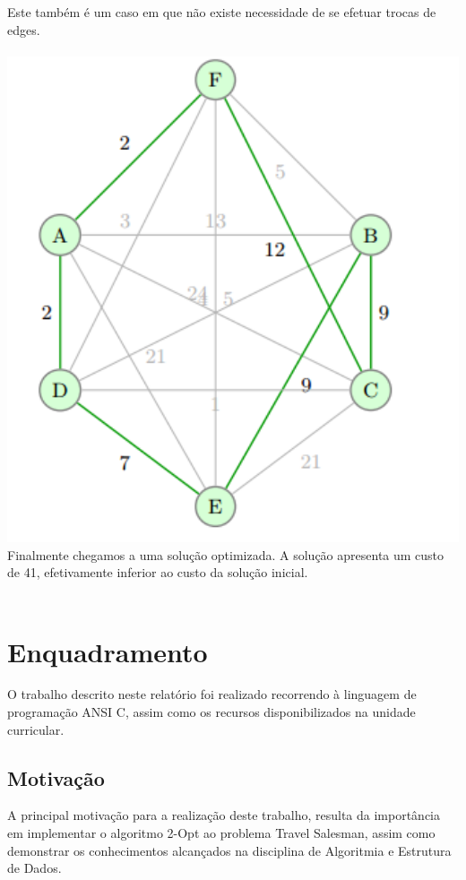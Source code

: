 \documentclass[12pt,a4paper,portrait]{article}
\begin{document}
			Este também é um caso em que não existe necessidade de se efetuar trocas de edges.\\\\
			\includegraphics[width=1.0\textwidth]{imagens/9}
			Finalmente chegamos a uma solução optimizada. A solução apresenta um custo de 41, efetivamente inferior ao custo da solução inicial.\\\\
			\newpage
	\section{Enquadramento}
	O trabalho descrito neste relatório foi realizado recorrendo à linguagem de programação ANSI C, assim como os recursos disponibilizados na unidade curricular.\\
		\subsection{Motivação}
			A principal motivação para a realização deste trabalho, resulta da importância em implementar o algoritmo 2-Opt ao problema Travel Salesman, assim como demonstrar os conhecimentos alcançados na disciplina de Algoritmia e Estrutura de Dados.\\
\end{document}
